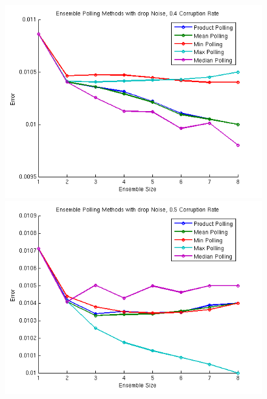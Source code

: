 \documentclass{article} %
\begin{document}
\begin{figure}[ht] 
  \label{fig:PollingMethods} 
  \begin{minipage}[b]{0.5\linewidth}
    \centering
    \includegraphics[width=\linewidth]{methods8} 
    \vspace{4ex}
  \end{minipage}%
  \begin{minipage}[b]{0.5\linewidth}
    \centering
    \includegraphics[width=\linewidth]{methods7} 
    \vspace{4ex}
  \end{minipage} 
  \begin{minipage}[b]{0.5\linewidth}

\end{minipage}
\end{figure}
\end{document}
